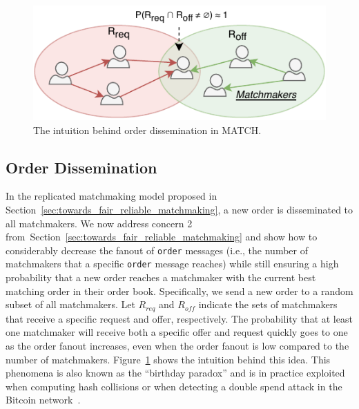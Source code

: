 \begin{figure}[t]
	\centering
	\includegraphics[width=.8\linewidth]{match/assets/matching_idea}
	\caption{The intuition behind order dissemination in MATCH.}
	\label{fig:matching_idea}
\end{figure}

\subsection{Order Dissemination}
\label{sec:order_dissemination}
In the replicated matchmaking model proposed in Section~\ref{sec:towards_fair_reliable_matchmaking}, a new order is disseminated to all matchmakers.
We now address concern 2 from~Section~\ref{sec:towards_fair_reliable_matchmaking} and show how to considerably decrease the fanout of \texttt{order} messages (i.e., the number of matchmakers that a specific \texttt{order} message reaches) while still ensuring a high probability that a new order reaches a matchmaker with the current best matching order in their order book.
Specifically, we send a new order to a random subset of all matchmakers.
Let $ R_{req} $ and $ R_{off} $ indicate the sets of matchmakers that receive a specific request and offer, respectively.
The probability that at least one matchmaker will receive both a specific offer and request quickly goes to one as the order fanout increases, even when the order fanout is low compared to the number of matchmakers.
Figure~\ref{fig:matching_idea} shows the intuition behind this idea.
This phenomena is also known as the \enquote{birthday paradox} and is in practice exploited when computing hash collisions or when detecting a double spend attack in the Bitcoin network~\cite{schreiber2020k}.

